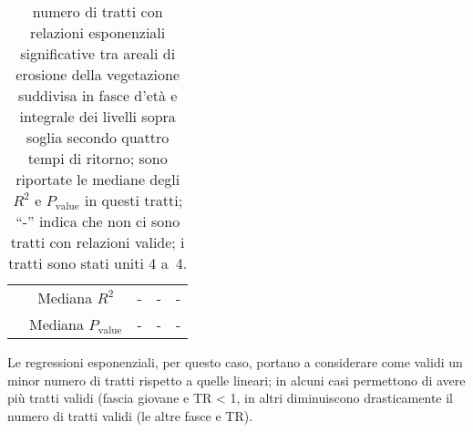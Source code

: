 \begin{table}
\begin{tabular}{c c *{3}{S[table-format = 2.3, table-comparator = true]}}
			&	Mediana $R^2$	&	{-}	&	{-}	&	{-}	\\
			&	Mediana $P_\mathrm{value}$	&	{-}	&	{-}	&	{-}	\\
		\bottomrule
	\end{tabular}
	\caption[numero di tratti nei gruppi di~4 tratti con relazioni esponenziali significative dividendo la vegetazione in classi d'età e considerando gli areali anziché i tassi di erosione]{numero di tratti con relazioni esponenziali significative tra areali di erosione della vegetazione suddivisa in fasce d'età e integrale dei livelli sopra soglia secondo quattro tempi di ritorno; sono riportate le mediane degli $R^2$ e $P_\mathrm{value}$ in questi tratti; “-” indica che non ci sono tratti con relazioni valide; i tratti sono stati uniti 4 a~4.}
	\label{tab:nc-4tr-log-ntr-r2-pval}
\end{table}
%
Le regressioni esponenziali, per questo caso, portano a considerare come validi un minor numero di tratti rispetto a quelle lineari; in alcuni casi permettono di avere più tratti validi (fascia giovane e TR \SI{< 1}{\anno}, in altri diminuiscono drasticamente il numero di tratti validi (le altre fasce e TR).


